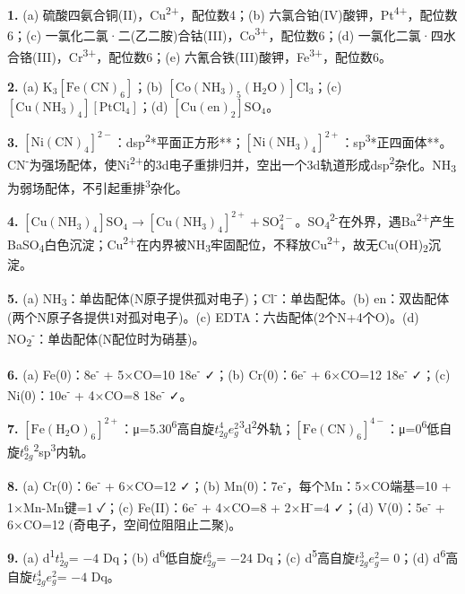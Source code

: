 \textbf{1.} (a) 硫酸四氨合铜(II)，Cu\textsuperscript{2+}，配位数4；(b) 六氯合铂(IV)酸钾，Pt\textsuperscript{4+}，配位数6；(c) 一氯化二氯·二(乙二胺)合钴(III)，Co\textsuperscript{3+}，配位数6；(d) 一氯化二氯·四水合铬(III)，Cr\textsuperscript{3+}，配位数6；(e) 六氰合铁(III)酸钾，Fe\textsuperscript{3+}，配位数6。

\textbf{2.} (a) \(\mathrm{K_3[Fe(CN)_6]}\)；(b) \(\mathrm{[Co(NH_3)_5(H_2O)]Cl_3}\)；(c) \(\mathrm{[Cu(NH_3)_4][PtCl_4]}\)；(d) \(\mathrm{[Cu(en)_2]SO_4}\)。

\textbf{3.} \(\mathrm{[Ni(CN)_4]^{2-}}\)：dsp\textsuperscript{2}\箭**平面正方形**；\(\mathrm{[Ni(NH_3)_4]^{2+}}\)：sp\textsuperscript{3}\箭**正四面体**。CN\textsuperscript{-}为强场配体，使Ni\textsuperscript{2+}的3d电子重排归并，空出一个3d轨道形成dsp\textsuperscript{2}杂化。NH\textsubscript{3}为弱场配体，不引起重排\textsuperscript{3}杂化。

\textbf{4.} \(\mathrm{[Cu(NH_3)_4]SO_4 \rightarrow [Cu(NH_3)_4]^{2+} + SO_4^{2-}}\)。SO\textsubscript{4}\textsuperscript{2-}在外界，遇Ba\textsuperscript{2+}产生BaSO\textsubscript{4}白色沉淀；Cu\textsuperscript{2+}在内界被NH\textsubscript{3}牢固配位，不释放Cu\textsuperscript{2+}，故无Cu(OH)\textsubscript{2}沉淀。

\textbf{5.} (a) NH\textsubscript{3}：单齿配体(N原子提供孤对电子)；Cl\textsuperscript{-}：单齿配体。(b) en：双齿配体(两个N原子各提供1对孤对电子)。(c) EDTA：六齿配体(2个N+4个O)。(d) NO\textsubscript{2}\textsuperscript{-}：单齿配体(N配位时为硝基)。

\textbf{6.} (a) Fe(0)：8e\textsuperscript{-} + 5×CO=10 \箭 18e\textsuperscript{-} ✓；(b) Cr(0)：6e\textsuperscript{-} + 6×CO=12 \箭 18e\textsuperscript{-} ✓；(c) Ni(0)：10e\textsuperscript{-} + 4×CO=8 \箭 18e\textsuperscript{-} ✓。

\textbf{7.} \(\mathrm{[Fe(H_2O)_6]^{2+}}\)：μ=5.30\textsuperscript{6}高自旋\(t_{2g}^4 e_g^2\)\textsuperscript{3}d\textsuperscript{2}外轨；\(\mathrm{[Fe(CN)_6]^{4-}}\)：μ=0\textsuperscript{6}低自旋\(t_{2g}^6\)\textsuperscript{2}sp\textsuperscript{3}内轨。

\textbf{8.} (a) Cr(0)：6e\textsuperscript{-} + 6×CO=12  ✓；(b) Mn(0)：7e\textsuperscript{-}，每个Mn：5×CO端基=10 + 1×Mn-Mn键=1  ✓；(c) Fe(II)：6e\textsuperscript{-} + 4×CO=8 + 2×H\textsuperscript{-}=4  ✓；(d) V(0)：5e\textsuperscript{-} + 6×CO=12 (奇电子，空间位阻阻止二聚)。

\textbf{9.} (a) d\textsuperscript{1}\箭\(t_{2g}^1\) = \(-4\) Dq；(b) d\textsuperscript{6}低自旋\箭\(t_{2g}^6\) = \(-24\) Dq；(c) d\textsuperscript{5}高自旋\箭\(t_{2g}^3 e_g^2\) = 0；(d) d\textsuperscript{6}高自旋\箭\(t_{2g}^4 e_g^2\) = \(-4\) Dq。

